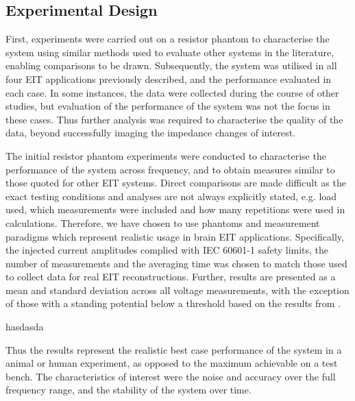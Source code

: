 \subsection{Experimental Design}

First, experiments were carried out on a resistor phantom to characterise the system using similar methods  used to evaluate other systems in the literature, enabling comparisons to be drawn. Subsequently, the system was utilised in all four EIT applications previously described, and the performance evaluated in each case. In some instances, the data were collected during the course of other studies, but evaluation of the performance of the system was not the focus in these cases. Thus further analysis was required to characterise the quality of the data, beyond successfully imaging the impedance changes of interest. 

The initial resistor phantom experiments were conducted to characterise the performance of the system across frequency, and to obtain measures similar to those quoted for other EIT systems. Direct comparisons are made difficult as the exact testing conditions and analyses are not always explicitly stated, e.g. load used, which measurements were included and how many repetitions were used in calculations. Therefore, we have chosen to use phantoms and measurement paradigms which represent realistic usage in brain EIT applications. Specifically, the injected current amplitudes complied with IEC 60601-1 \cite{IEC} safety limits, the number of measurements and the averaging time was chosen to match those used to collect data for real EIT reconstructions. Further, results are presented as a mean and standard deviation across all voltage measurements, with the exception of those with a standing potential below a threshold based on the results from \citet{packham2012comparison}.

hasdasda

Thus the results represent the realistic best case performance of the system in a animal or human experiment, as opposed to the maximum achievable on a test bench. The characteristics of interest were the noise and accuracy over the full frequency range, and the stability of the system over time. 


